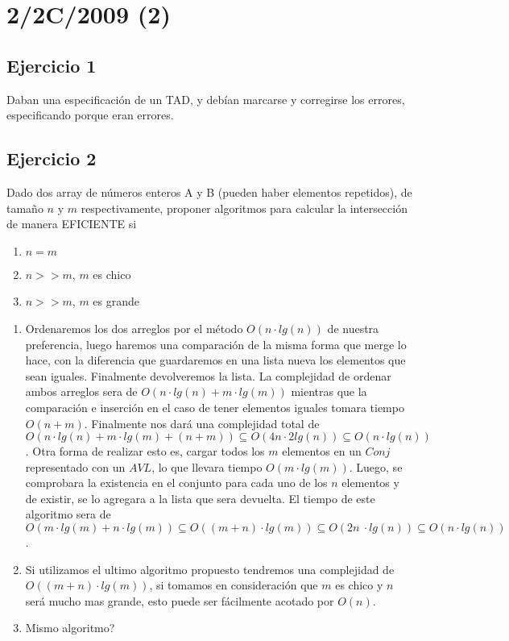 \documentclass[10pt, a4paper]{article}
\begin{document}
\newpage
\section{2/2C/2009 (2)}

\subsection*{Ejercicio 1}

Daban una especificaci\'on de un TAD, y deb\'ian marcarse y corregirse los errores, especificando porque eran errores.

\subsection*{Ejercicio 2}

Dado dos array de n\'umeros enteros A y B (pueden haber elementos repetidos), de tama\~no $n$ y $m$ respectivamente, proponer algoritmos para calcular la intersecci\'on de manera EFICIENTE si

\begin{enumerate}
 \item $n = m$
 \item $n >> m$, $m$ es chico
 \item $n >> m$, $m$ es grande
\end{enumerate}

\begin{enumerate}
 \item Ordenaremos los dos arreglos por el m\'etodo $O(n\cdot lg(n))$ de nuestra preferencia, luego haremos una comparaci\'on de la misma forma que merge lo hace, con la diferencia que guardaremos en una lista nueva los elementos que sean iguales. Finalmente devolveremos la lista. La complejidad de ordenar ambos arreglos sera de $O(n\cdot lg(n) + m \cdot lg(m))$ mientras que la comparaci\'on e inserci\'on en el caso de tener elementos iguales tomara tiempo $O(n+m)$. Finalmente nos dar\'a una complejidad total de $O(n\cdot lg(n) + m \cdot lg(m) + (n+m)) \subseteq O(4n \cdot 2lg(n)) \subseteq O(n \cdot lg(n))$. Otra forma de realizar esto es, cargar todos los $m$ elementos en un $Conj$ representado con un $AVL$, lo que llevara tiempo $O(m \cdot lg(m))$. Luego, se comprobara la existencia en el conjunto para cada uno de los $n$ elementos y de existir, se lo agregara a la lista que sera devuelta. El tiempo de este algoritmo sera de $O(m\cdot lg(m) + n \cdot lg(m)) \subseteq O((m+n) \cdot lg(m)) \subseteq O(2n \
\cdot lg(n)) \subseteq O(n \cdot lg(n))$.
 \item Si utilizamos el ultimo algoritmo propuesto tendremos una complejidad de $O((m+n) \cdot lg(m))$, si tomamos en consideraci\'on que $m$ es chico y $n$ ser\'a mucho mas grande, esto puede ser f\'acilmente acotado por $O(n)$. 

 \item {\color{red}Mismo algoritmo?}
\end{enumerate}
\end{document}
